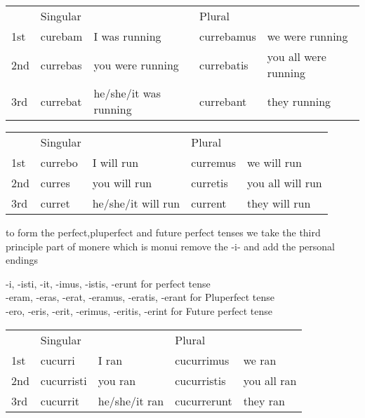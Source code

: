 \begin{center}  
  \begin{tabular}{lllll}
    \centering
    & Singular & & Plural &  \\
    1st & curebam & I was running& currebamus & we were running\\
    2nd & currebas & you were running& currebatis & you all were running\\ 
    3rd & currebat & he/she/it was running& currebant & they running\\
  \end{tabular}
\end{center}
\begin{center}  
  \begin{tabular}{lllll}
    \centering
    & Singular & & Plural &  \\
    1st & currebo & I will run& curremus & we will run\\
    2nd & curres & you will run& curretis & you all will run\\ 
    3rd & curret & he/she/it will run& current & they will run\\
  \end{tabular}
\end{center}
to form the perfect,pluperfect and future perfect tenses we take the 
third principle part of monere which is monui remove the -i- and add 
the personal endings
\begin{center}
 -i, -isti, -it, -imus, -istis, -erunt for perfect tense \\
 -eram, -eras, -erat, -eramus, -eratis, -erant for Pluperfect tense \\
 -ero, -eris, -erit, -erimus, -eritis, -erint for Future perfect tense
\end{center}

\begin{center}  
  \begin{tabular}{lllll}
    \centering
    & Singular & & Plural &  \\
    1st & cucurri & I ran& cucurrimus & we ran\\
    2nd & cucurristi & you ran& cucurristis & you all ran\\ 
    3rd & cucurrit & he/she/it ran& cucurrerunt & they ran\\
  \end{tabular}
\end{center}

